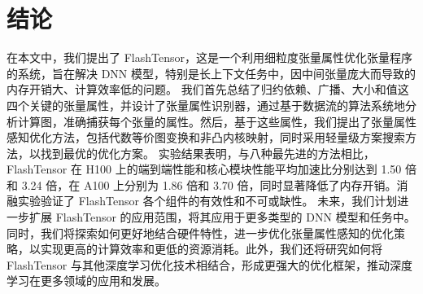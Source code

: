 \section{结论}
在本文中，我们提出了 FlashTensor，这是一个利用细粒度张量属性优化张量程序的系统，旨在解决 DNN 模型，特别是长上下文任务中，因中间张量庞大而导致的内存开销大、计算效率低的问题。
我们首先总结了归约依赖、广播、大小和值这四个关键的张量属性，并设计了张量属性识别器，通过基于数据流的算法系统地分析计算图，准确捕获每个张量的属性。然后，基于这些属性，我们提出了张量属性感知优化方法，包括代数等价图变换和非凸内核映射，同时采用轻量级方案搜索方法，以找到最优的优化方案。
实验结果表明，与八种最先进的方法相比，FlashTensor 在 H100 上的端到端性能和核心模块性能平均加速比分别达到 1.50 倍和 3.24 倍，在 A100 上分别为 1.86 倍和 3.70 倍，同时显著降低了内存开销。消融实验验证了 FlashTensor 各个组件的有效性和不可或缺性。
未来，我们计划进一步扩展 FlashTensor 的应用范围，将其应用于更多类型的 DNN 模型和任务中。同时，我们将探索如何更好地结合硬件特性，进一步优化张量属性感知的优化策略，以实现更高的计算效率和更低的资源消耗。此外，我们还将研究如何将 FlashTensor 与其他深度学习优化技术相结合，形成更强大的优化框架，推动深度学习在更多领域的应用和发展。
